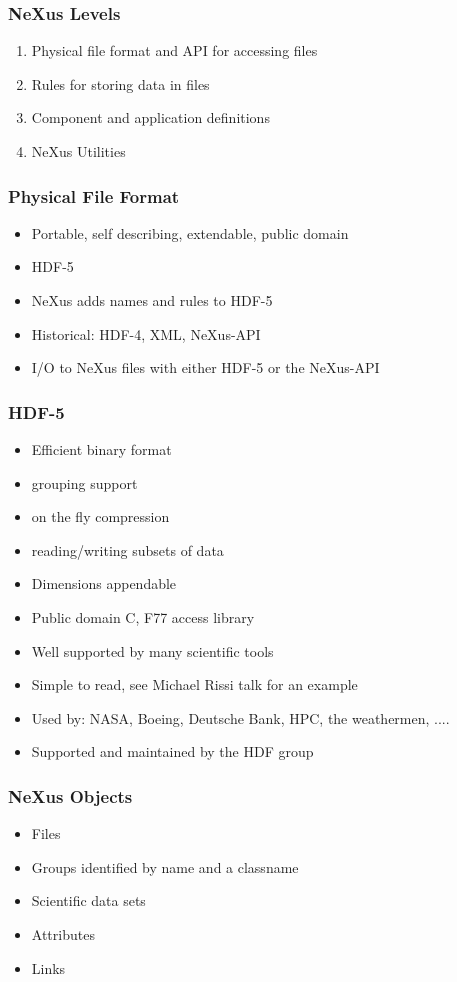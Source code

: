 \documentclass{beamer}
\begin{document}
\begin{frame}
 \frametitle{NeXus Levels }
\begin{enumerate}
\item Physical file format and API for accessing files
\item Rules for storing data in files
\item Component and application definitions
\item NeXus Utilities
\end{enumerate}
\end{frame}


\begin{frame} \frametitle{Physical File Format}
\begin{itemize}
\item Portable, self describing, extendable, public domain
\item HDF-5
\item NeXus adds names and rules to HDF-5
\item Historical: HDF-4, XML, NeXus-API 
\item I/O to NeXus files with either HDF-5 or the NeXus-API
\end{itemize}
\end{frame}

\begin{frame} \frametitle{HDF-5}
\begin{itemize}
\item Efficient binary format
\item grouping support
\item on the fly compression
\item reading/writing subsets of data
\item Dimensions appendable
\item Public domain C, F77 access library
\item Well supported by many scientific tools
\item Simple to read, see Michael Rissi talk for an example
\item Used by: NASA, Boeing, Deutsche Bank, HPC, the weathermen, .... 
\item Supported and maintained by the HDF group
\end{itemize}
\end{frame}

\begin{frame} \frametitle{NeXus Objects}
\begin{itemize}
\item Files
\item Groups identified by name and a classname
\item Scientific data sets
\item Attributes
\item Links
\end{itemize}
\end{frame}
\end{document}
